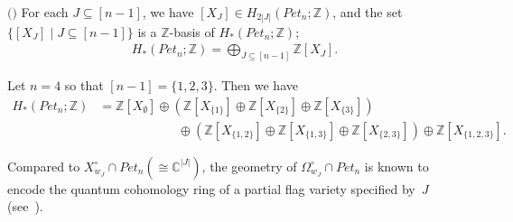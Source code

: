 \begin{prop}\label{prop: homology basis}
$($\cite{Peterson,ty}$)$
For each $J\subseteq [n-1]$, we have $[X_J]\in H_{2|J|}(Pet_{n};{\mathbb Z})$, and the set
$\{ [X_J] \mid J\subseteq [n-1]\}$ is a ${\mathbb Z}$-basis of $H_*(Pet_{n};{\mathbb Z})$; 
\begin{align*}
 H_*(Pet_{n};{\mathbb Z}) = \bigoplus_{J\subseteq [n-1]} {\mathbb Z} [X_J] .
\end{align*}
\end{prop}

\begin{exam}\label{ex: homology basis}
{\rm 
Let $n=4$ so that $[n-1]=\{1,2,3\}$. Then we have 
\begin{align*}
H_*(Pet_{n};{\mathbb Z}) &= {\mathbb Z} [X_{\emptyset}]\oplus({\mathbb Z} [X_{\{1\}}]\oplus{\mathbb Z} [X_{\{2\}}]\oplus{\mathbb Z} [X_{\{3\}}])\\
&\hspace{75pt}\oplus({\mathbb Z} [X_{\{1,2\}}]\oplus{\mathbb Z} [X_{\{1,3\}}]\oplus{\mathbb Z} [X_{\{2,3\}}])\oplus{\mathbb Z} [X_{\{1,2,3\}}].
\end{align*}}
\end{exam}

\begin{rema}
Compared to $X^{\circ}_{w_J}\cap Pet_{n}(\cong {\mathbb C}^{|J|})$, the geometry of $\Omega^{\circ}_{w_J}\cap Pet_{n}$ is known to encode the quantum cohomology ring of a partial flag variety specified by~$J$ (see~\cite{Peterson, Rietsch06}).
\end{rema}

